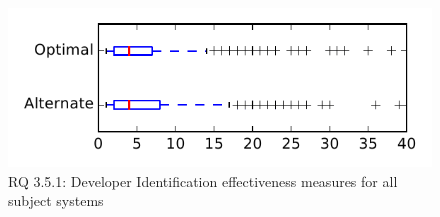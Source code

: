 
\begin{figure}
\centering
\includegraphics[height=0.4\textheight]{figures/combo/dit_rq1_tiny}
\caption{RQ 3.5.1: Developer Identification effectiveness measures for all subject systems}
\label{fig:dit:rq1:tiny}
\end{figure}
